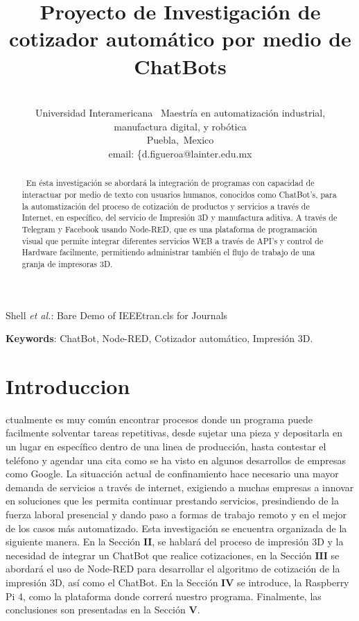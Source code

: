 \documentclass[conference]{IEEEtran}
\begin{document}
\title{Proyecto de Investigación de cotizador automático por medio de ChatBots}
\author
{
\\
\IEEEauthorblockA
{
	Universidad Interamericana~ Maestría en automatización industrial, \\manufactura 		digital, y robótica\\
	Puebla,~Mexico \\
	email: \{d.figueroa@lainter.edu.mx}
}



\markboth{}%
{Shell \MakeLowercase{\textit{et al.}}: Bare Demo of IEEEtran.cls for Journals}

\maketitle


 
\begin{abstract}
 ~En ésta investigación se abordará la integración de programas con capacidad de interactuar por medio de texto con usuarios humanos, conocidos como ChatBot's, para la automatización del proceso de cotización de productos y servicios a través de Internet, en específico, del servicio de Impresión 3D y manufactura aditiva. A través de Telegram y Facebook usando Node-RED, que es una plataforma de programación visual que permite integrar diferentes servicios WEB a través de API's y control de Hardware facilmente, permitiendo administrar también el flujo de trabajo de una granja de impresoras 3D.
\end{abstract}
\vspace{0.5cm}
\textbf{Keywords}:  ChatBot, Node-RED, Cotizador automático, Impresión 3D.

\IEEEpeerreviewmaketitle
\section{Introduccion}
ctualmente es muy común encontrar procesos donde un programa puede facilmente solventar tareas repetitivas, desde sujetar una pieza y depositarla en un lugar en específico dentro de una linea de producción, hasta contestar el teléfono y agendar una cita como se ha visto en algunos desarrollos de empresas como Google. La situacción actual de confinamiento hace necesario una mayor demanda de servicios a través de internet, exigiendo a muchas empresas a innovar en soluciones que les permita continuar prestando servicios, presindiendo de la fuerza laboral presencial y dando paso a formas de trabajo remoto y en el mejor de los casos más automatizado. Esta investigación se encuentra organizada de la siguiente manera. En la Sección $\mathbf{II}$, se hablará del proceso de impresión 3D y la necesidad de integrar un ChatBot que realice cotizaciones, en la Sección $\mathbf{III}$ se abordará el uso de Node-RED para desarrollar el algoritmo de cotización de la impresión 3D, así como el ChatBot. En la Sección $\mathbf{IV}$ se introduce, la Raspberry Pi 4, como la plataforma donde correrá nuestro programa. Finalmente, las conclusiones son presentadas en la Sección $\mathbf{V}$.
\end{document}
